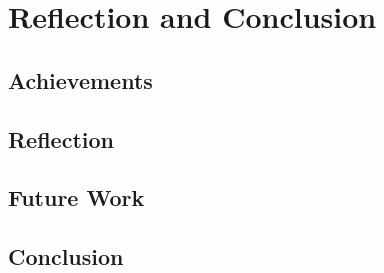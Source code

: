 \chapter{Reflection and Conclusion}

\section{Achievements}

\section{Reflection}

\section{Future Work}

\section{Conclusion}

